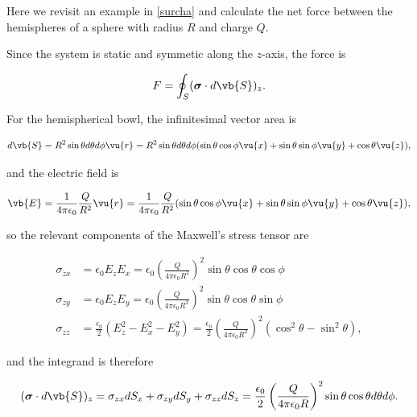 \documentclass[english,a4paper,12pt]{report}
\begin{document}
{Here we revisit an example in \cref{surcha} and calculate the net force between the hemispheres of a sphere with radius \(R\) and charge \(Q\).}
{Since the system is static and symmetic along the \(z\)-axis, the force is 

\begin{equation}
    F = \oint_{S} (\boldsymbol{\sigma } \cdot d\vb{S}  )_{z}.
\end{equation}

For the hemispherical bowl, the infinitesimal vector area is 

\begin{equation}
    d\vb{S} = R^2\sin \theta d \theta d\phi \vu{r} = R^2\sin \theta d \theta d\phi (\sin \theta \cos \phi \vu{x} + \sin \theta \sin \phi \vu{y} + \cos \theta \vu{z} ),
\end{equation}

and the electric field is 

\begin{equation}
    \vb{E} = \frac{1}{4\pi \epsilon_0} \frac{Q}{R^2}\vu{r} = \frac{1}{4\pi \epsilon_0} \frac{Q}{R^2} (\sin \theta \cos \phi \vu{x} + \sin \theta \sin \phi \vu{y} +\cos \theta \vu{z}),
\end{equation}

so the relevant components of the Maxwell's stress tensor are 

\begin{equation}
    \begin{aligned}
        \sigma _{zx} &= \epsilon_0 E_{z}E_{x} = \epsilon_0 \left( \frac{Q}{4\pi \epsilon_0 R^2}  \right)^2 \sin \theta \cos \theta \cos \phi \\
        \sigma _{zy} &= \epsilon_0 E_{z}E_{y} = \epsilon_0 \left( \frac{Q}{4\pi \epsilon_0 R^2}  \right)^2 \sin \theta \cos \theta \sin \phi \\
        \sigma _{zz} &= \frac{\epsilon_0 }{2}\left( E_{z}^2- E_{x}^2-E_{y}^2    \right) = \frac{\epsilon_0 }{2} \left( \frac{Q}{4\pi \epsilon_0 R^2}   \right)^2 (\cos ^2\theta - \sin ^2\theta ),
    \end{aligned}
\end{equation}

and the integrand is therefore

\begin{equation}
    (\boldsymbol{\sigma } \cdot d\vb{S} )_{z} =  \sigma _{zx}dS_{x} + \sigma _{zy}dS_{y}+ \sigma _{zz}dS_{z} = \frac{\epsilon_0 }{2} \left( \frac{Q}{4\pi \epsilon_0 R}   \right)^2 \sin \theta \cos \theta d \theta d\phi .       
\end{equation}

}
\end{document}
